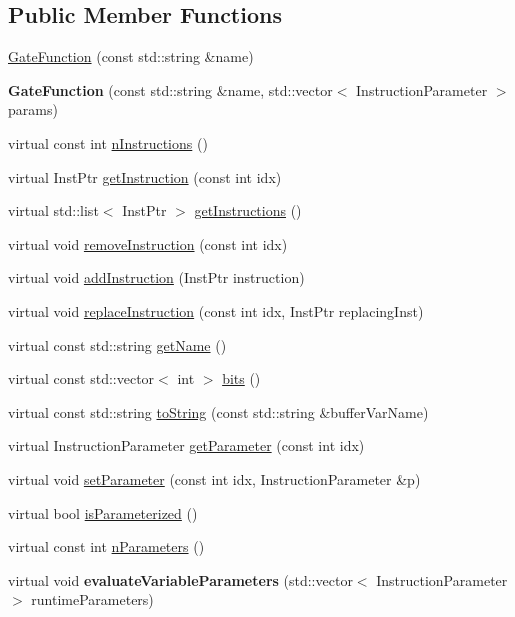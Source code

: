 \subsection*{Public Member Functions}
\begin{DoxyCompactItemize}
\item 
\hyperlink{a00032_a77545e72bd53268f609888654fcd8eee}{Gate\+Function} (const std\+::string \&name)
\item 
{\bfseries Gate\+Function} (const std\+::string \&name, std\+::vector$<$ Instruction\+Parameter $>$ params)\hypertarget{a00032_a0b1b3fb51a5b0f1bcb1b10692ab2e595}{}\label{a00032_a0b1b3fb51a5b0f1bcb1b10692ab2e595}

\item 
virtual const int \hyperlink{a00032_aa70b26156c060fec71316fe5e98bb102}{n\+Instructions} ()
\item 
virtual Inst\+Ptr \hyperlink{a00032_a841d656eed8aa9b4c0eec3f1da38069c}{get\+Instruction} (const int idx)
\item 
virtual std\+::list$<$ Inst\+Ptr $>$ \hyperlink{a00032_aebce6a9e64aed7f4aff86df752bacfe2}{get\+Instructions} ()
\item 
virtual void \hyperlink{a00032_a44ca35d081577de9ad2930f93c01e89d}{remove\+Instruction} (const int idx)
\item 
virtual void \hyperlink{a00032_a892fb69a10f0a7cb5abdab4cca61b80a}{add\+Instruction} (Inst\+Ptr instruction)
\item 
virtual void \hyperlink{a00032_a182fdfabbf546ae89e4f2384bafb45c9}{replace\+Instruction} (const int idx, Inst\+Ptr replacing\+Inst)
\item 
virtual const std\+::string \hyperlink{a00032_af42efb6191267164717d53c469e15d3a}{get\+Name} ()
\item 
virtual const std\+::vector$<$ int $>$ \hyperlink{a00032_aba03de68b76a9e120705c3c389c714a1}{bits} ()
\item 
virtual const std\+::string \hyperlink{a00032_aa1950776ae84bad2d0795a0441f910e7}{to\+String} (const std\+::string \&buffer\+Var\+Name)
\item 
virtual Instruction\+Parameter \hyperlink{a00032_a5991903323e412777bedc4f0c862eb63}{get\+Parameter} (const int idx)
\item 
virtual void \hyperlink{a00032_ab8d9789b46e92e27a9d7c9c5b7e3683c}{set\+Parameter} (const int idx, Instruction\+Parameter \&p)
\item 
virtual bool \hyperlink{a00032_afad47903e0ed55ddbfa827ef8408a94b}{is\+Parameterized} ()
\item 
virtual const int \hyperlink{a00032_ad0bffcbc0884d81d6bdddf55385fc6c9}{n\+Parameters} ()
\item 
virtual void {\bfseries evaluate\+Variable\+Parameters} (std\+::vector$<$ Instruction\+Parameter $>$ runtime\+Parameters)\hypertarget{a00032_a4bcbd2c8c4b615d74e4a4d39952fd411}{}\label{a00032_a4bcbd2c8c4b615d74e4a4d39952fd411}

\end{DoxyCompactItemize}
